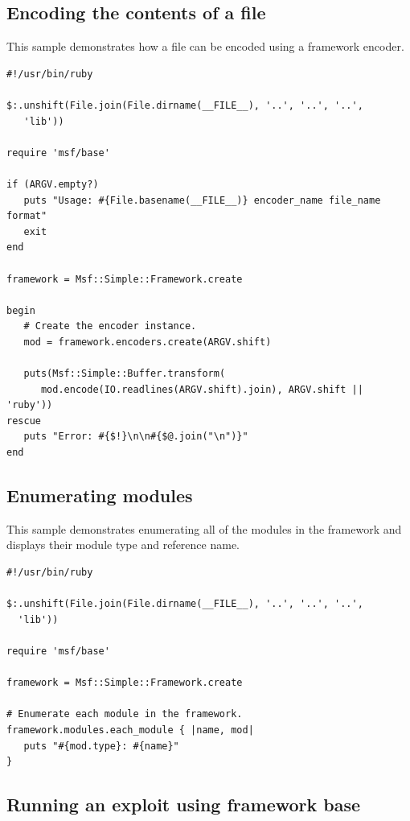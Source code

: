 \documentclass{report}
\begin{document}
        \subsection{Encoding the contents of a file}

\par
This sample demonstrates how a file can be encoded using a framework
encoder.

\footnotesize{
\begin{verbatim}
#!/usr/bin/ruby

$:.unshift(File.join(File.dirname(__FILE__), '..', '..', '..',
   'lib'))

require 'msf/base'

if (ARGV.empty?)
   puts "Usage: #{File.basename(__FILE__)} encoder_name file_name format"
   exit
end

framework = Msf::Simple::Framework.create

begin
   # Create the encoder instance.
   mod = framework.encoders.create(ARGV.shift)

   puts(Msf::Simple::Buffer.transform(
      mod.encode(IO.readlines(ARGV.shift).join), ARGV.shift || 'ruby'))
rescue
   puts "Error: #{$!}\n\n#{$@.join("\n")}"
end
\end{verbatim}}

        \subsection{Enumerating modules}

\par
This sample demonstrates enumerating all of the modules in the
framework and displays their module type and reference name.

\footnotesize{
\begin{verbatim}
#!/usr/bin/ruby

$:.unshift(File.join(File.dirname(__FILE__), '..', '..', '..',
  'lib'))

require 'msf/base'

framework = Msf::Simple::Framework.create

# Enumerate each module in the framework.
framework.modules.each_module { |name, mod|
   puts "#{mod.type}: #{name}"
}
\end{verbatim}}

        \subsection{Running an exploit using framework base}
\end{document}
